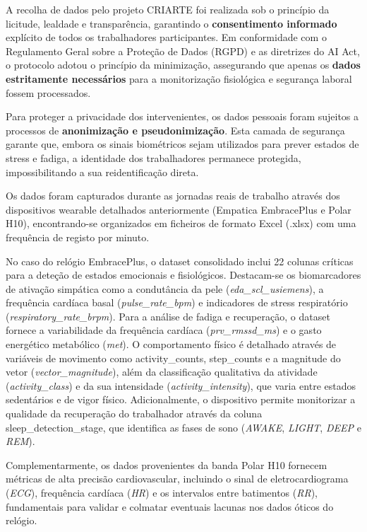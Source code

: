 A recolha de dados pelo projeto CRIARTE foi realizada sob o princípio da licitude, lealdade e transparência, garantindo o \textbf{consentimento informado} explícito de todos os trabalhadores participantes. Em conformidade com o Regulamento Geral sobre a Proteção de Dados (RGPD) e as diretrizes do AI Act, o protocolo adotou o princípio da minimização, assegurando que apenas os \textbf{dados estritamente necessários} para a monitorização fisiológica e segurança laboral fossem processados.

Para proteger a privacidade dos intervenientes, os dados pessoais foram sujeitos a processos de \textbf{anonimização e pseudonimização}. Esta camada de segurança garante que, embora os sinais biométricos sejam utilizados para prever estados de stress e fadiga, a identidade dos trabalhadores permanece protegida, impossibilitando a sua reidentificação direta.

Os dados foram capturados durante as jornadas reais de trabalho através dos dispositivos wearable detalhados anteriormente (Empatica EmbracePlus e Polar H10), encontrando-se organizados em ficheiros de formato Excel (.xlsx) com uma frequência de registo por minuto.

No caso do relógio EmbracePlus, o dataset consolidado inclui 22 colunas críticas para a deteção de estados emocionais e fisiológicos. Destacam-se os biomarcadores de ativação simpática como a condutância da pele (\textit{eda\_scl\_usiemens}), a frequência cardíaca basal (\textit{pulse\_rate\_bpm}) e indicadores de stress respiratório (\textit{respiratory\_rate\_brpm}). Para a análise de fadiga e recuperação, o dataset fornece a variabilidade da frequência cardíaca (\textit{prv\_rmssd\_ms}) e o gasto energético metabólico (\textit{met}). O comportamento físico é detalhado através de variáveis de movimento como activity\_counts, step\_counts e a magnitude do vetor (\textit{vector\_magnitude}), além da classificação qualitativa da atividade (\textit{activity\_class}) e da sua intensidade (\textit{activity\_intensity}), que varia entre estados sedentários e de vigor físico. Adicionalmente, o dispositivo permite monitorizar a qualidade da recuperação do trabalhador através da coluna sleep\_detection\_stage, que identifica as fases de sono (\textit{AWAKE}, \textit{LIGHT}, \textit{DEEP} e \textit{REM}).

Complementarmente, os dados provenientes da banda Polar H10 fornecem métricas de alta precisão cardiovascular, incluindo o sinal de eletrocardiograma (\textit{ECG}), frequência cardíaca (\textit{HR}) e os intervalos entre batimentos (\textit{RR}), fundamentais para validar e colmatar eventuais lacunas nos dados óticos do relógio.


